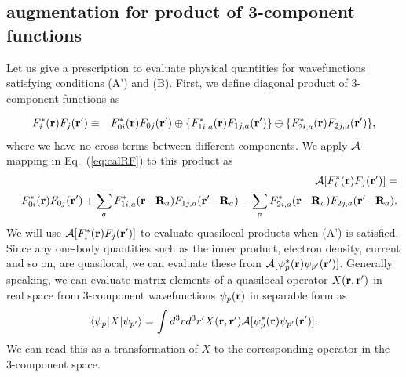 \documentclass[a4paper,10pt,aip,onecolumn,amsmath,amssymb,floatfix,rmp]{revtex4-1}
\newcommand{\bfr}{{\bf r}}
\newcommand{\bfR}{{\bf R}}
\newcommand{\ooplus}{\oplus}
\newcommand{\oominus}{\ominus}
\def\calR{{\cal A}}
\newcommand{\req}[1]{\mbox{Eq.~\!(\ref{#1})}}
\begin{document}
\subsection{augmentation for product of 3-component functions}
\label{aug3} Let us give a prescription to evaluate physical quantities
for wavefunctions satisfying conditions (A') and (B).  First, we define
diagonal product of 3-component functions as
\begin{widetext}
\begin{eqnarray}
F^*_i(\bfr)F_{j}(\bfr') &\equiv& F^*_{0i}(\bfr)F_{0j}(\bfr')
\ooplus  \{ F^*_{1i,a}(\bfr) F_{1j,a}(\bfr')\}
\oominus \{ F^*_{2i,a}(\bfr) F_{2j,a}(\bfr')\}, \label{fnproduct}
\end{eqnarray}
where we have no cross terms between different components.
We apply $\calR$-mapping in \req{eq:calRF} to this product as
\begin{eqnarray}
&&\calR[F^*_i(\bfr)F_{j}(\bfr')] = \nonumber \\ 
&&F^*_{0i}(\bfr)F_{0j}(\bfr')
+ \sum_a F^*_{1i,a}(\bfr\!-\!\bfR_a) F_{1j,a}(\bfr'\!-\!\bfR_a)
- \sum_a F^*_{2i,a}(\bfr\!-\!\bfR_a)F_{2j,a}(\bfr'\!-\!\bfR_a). \label{fnmap}
\end{eqnarray}
We will use $\calR[F^*_i(\bfr)F_{j}(\bfr')]$ to evaluate quasilocal 
products when (A') is satisfied.
Since any one-body quantities such as the inner product, electron density,
current and so on, are quasilocal, we can evaluate these from 
$\calR[\psi^*_p(\bfr)\psi_{p'}(\bfr')]$.
Generally speaking, we can evaluate matrix elements of a
quasilocal operator $X(\bfr,\bfr')$ in real space
from 3-component wavefunctions $\psi_p(\bfr)$ in separable form as 
\begin{eqnarray}
\langle \psi_p|X|\psi_{p'} \rangle=\int d^3r d^3r' X(\bfr,\bfr') 
\calR[\psi^*_p(\bfr)\psi_{p'}(\bfr')].
\end{eqnarray}
We can read this as a transformation of $X$ to the corresponding 
operator in the 3-component space.


\end{widetext}
\end{document}
